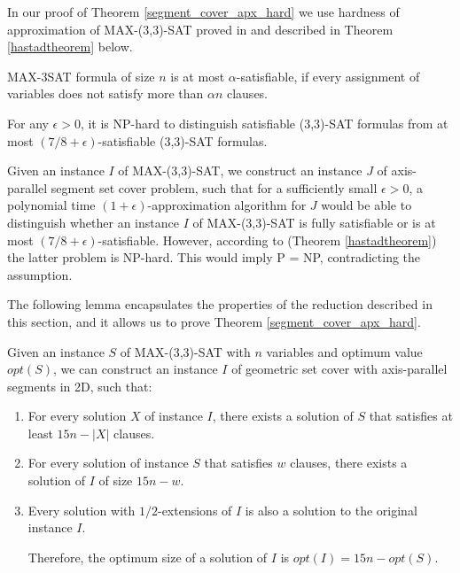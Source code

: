In our proof of Theorem \ref{segment_cover_apx_hard} we use
hardness of approximation of MAX-(3,3)-SAT proved
in \cite{hastad} and described in
Theorem \ref{hastadtheorem} below.

\begin{defi}
MAX-3SAT formula of size $n$ is at most $\alpha$-satisfiable, if
every assignment of variables does not satisfy more than $\alpha n$
clauses. 
\end{defi}

\begin{tw}{
	\label{hastadtheorem}
	\textbf{\cite{hastad}}
	
	For any $\epsilon > 0$, it is NP-hard to distinguish satisfiable
	(3,3)-SAT formulas from
	at most
	\linebreak\mbox{$(7/8 + \epsilon)$-satisfiable}
	(3,3)-SAT formulas.
}\end{tw}


Given an instance $I$ of MAX-(3,3)-SAT,
we construct an instance $J$ of 
axis-parallel segment set cover problem,
such that for a sufficiently small $\epsilon > 0$,
a polynomial time $(1+\epsilon)$-approximation algorithm for $J$
would be able to distinguish  whether an instance $I$ of MAX-(3,3)-SAT
is fully satisfiable
or is at most $(7/8 + \epsilon)$-satisfiable.
However, according to (Theorem \ref{hastadtheorem}) the latter problem
is NP-hard.
This would imply P = NP, contradicting the assumption.

The following lemma encapsulates the properties
of the reduction described in this section,
and it allows us to prove Theorem \ref{segment_cover_apx_hard}.

\begin{lemma}{
	\label{apxconstruction}
	Given an instance $S$ of  MAX-(3,3)-SAT 
	with $n$ variables and optimum value $opt(S)$,
	we can construct an instance $I$ of geometric set cover with
	axis-parallel segments in 2D, such that:
	\begin{enumerate}[label={(\arabic*)}]
	\item For every solution $X$ of instance $I$,
	there exists a solution of $S$ that satisfies at least  $15n - |X|$
	clauses.
	
	\item For every solution of instance $S$ that satisfies $w$ clauses,
	there exists a solution of $I$ of size $15n - w$.
	
	\item Every solution with $1/2$-extensions of $I$
	is also a solution to the original instance $I$.
		
	Therefore, the optimum size of a solution of $I$
	is $opt(I) = 15n - opt(S)$. 
	\end{enumerate}
	
}\end{lemma}

